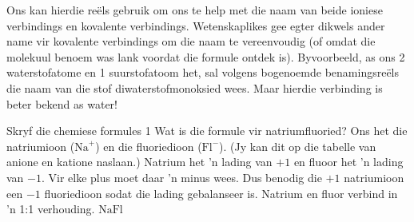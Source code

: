Ons kan hierdie reëls gebruik om ons te help met die naam van beide ioniese verbindings en kovalente verbindings. Wetenskaplikes gee egter dikwels ander name vir kovalente verbindings om die naam te vereenvoudig (of omdat die molekuul benoem was lank voordat die formule ontdek is). Byvoorbeeld, as ons 2 waterstofatome en 1 suurstofatoom het, sal volgens bogenoemde benamingsreëls die naam van die stof diwaterstofmonoksied wees. Maar hierdie verbinding is beter bekend as water!   \label{m38708*eip-254} 
\vspace{-.5cm}
\begin{wex}{Skryf die chemiese formules 1}
{Wat is die formule vir natriumfluoried? }
{
Ons het die natriumioon ($\text{Na}^{+}$) en die fluoriedioon ($\text{Fl}^{-}$). (Jy kan dit op die tabelle van anione en katione naslaan.)
Natrium het 'n lading van $+1$ en fluoor het 'n lading van $-1$.
Vir elke plus moet daar 'n minus wees. Dus benodig die $+1$ natriumioon een $-1$ fluoriedioon sodat die lading gebalanseer is. Natrium en fluor verbind in 'n 1:1 verhouding.
$\text{NaFl}$
}
\end{wex}
\vspace{.5cm}

